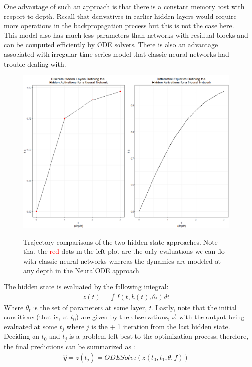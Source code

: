 \documentclass{article}
\begin{document}
\noindent One advantage of such an approach is that there is a constant memory cost with respect to depth. Recall that derivatives in earlier hidden layers would require more operations in the backpropagation process but this is not the case here. This model also has much less parameters than networks with residual blocks and can be computed efficiently by ODE solvers. There is also an advantage associated with irregular time-series model that classic neural networks had trouble dealing with.

\begin{figure}[h!]
  \centering
  \includegraphics[scale = 0.55]{comp_plot.png}
  \label{fig:comp_plot}
  \caption{Trajectory comparisons of the two hidden state approaches. Note that the \textcolor{red}{red} dots in the left plot are the only evaluations we can do with classic neural networks whereas the dynamics are modeled at any depth in the NeuralODE approach}
\end{figure}

\noindent The hidden state is evaluated by the following integral:
\begin{align}
    z(t) = \int f(t, h(t), \theta_{t}) dt
\end{align}
\noindent Where $\theta_{t}$ is the set of parameters at some layer, $t$. Lastly, note that the initial conditions (that is, at $t_{0}$) are given by the observations, $\vec{x}$ with the output being evaluated at some $t_{j}$ where $j$ is the + 1 iteration from the last hidden state. Deciding on $t_{0}$ and $t_{j}$ is a problem left best to the optimization process; therefore, the final predictions can be summarized as \cite{underODE1}:
\begin{align}
    \hat{y} = z(t_{j}) = ODESolve(z(t_{0}, t_{1}, \theta, f))
\end{align} 
\end{document}
